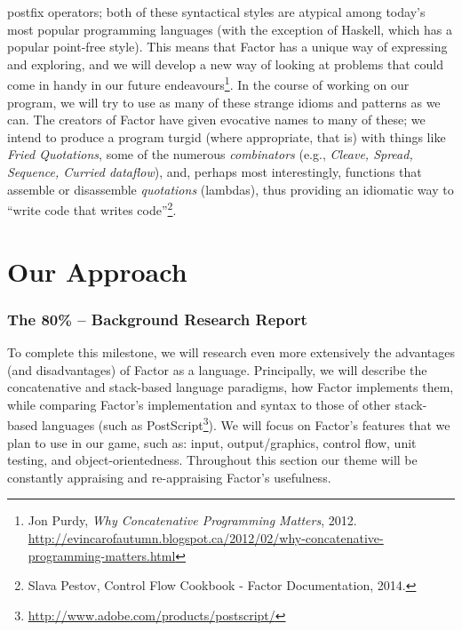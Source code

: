 \documentclass{sig-alternate}
\begin{document}
postfix operators; both of these syntactical styles are atypical among
today's most popular programming languages (with the exception of
Haskell, which has a popular point-free style). This means that Factor
has a unique way of expressing and exploring, and we will develop a
new way of looking at problems that could come in handy in our future
endeavours\footnote{Jon Purdy, \textit{Why Concatenative Programming Matters}, 2012. \url{http://evincarofautumn.blogspot.ca/2012/02/why-concatenative-programming-matters.html}}. In the course of working on our program, we will try to
use as many of these strange idioms and patterns as we can. The
creators of Factor have given evocative names to many of these; we
intend to produce a program turgid (where appropriate, that is) with
things like  \textit{Fried Quotations}, some of the numerous
\textit{combinators} (e.g., \textit{Cleave, Spread, Sequence, Curried
dataflow}), and, perhaps most interestingly, functions that assemble
or disassemble \textit{quotations} (lambdas), thus providing an
idiomatic way to ``write code that writes code''\footnote{Slava Pestov, Control Flow Cookbook - Factor Documentation, 2014. 
}.

\section{Our Approach}
\subsubsection*{The 80\% -- Background Research Report}
To complete this milestone, we will research even more
extensively the advantages (and disadvantages) of Factor as a
language. Principally, we will describe the concatenative and stack-based language paradigms, how Factor implements them, while comparing Factor's implementation and syntax to those of other stack-based languages (such as PostScript\footnote{\url{http://www.adobe.com/products/postscript/}}). We will focus on Factor's features that we plan to use in our game, such as: input, output/graphics, control flow, unit testing, and object-orientedness. Throughout this section our theme will be constantly appraising and re-appraising Factor's usefulness.
\end{document}
